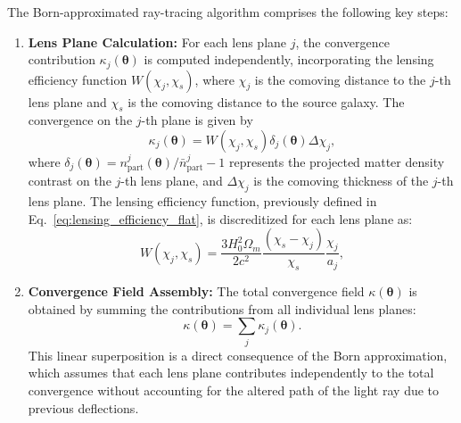 The Born-approximated ray-tracing algorithm comprises the following key steps:

\begin{enumerate}
    \item \textbf{Lens Plane Calculation:} 
    For each lens plane $j$, the convergence contribution $\kappa_j(\boldsymbol{\theta})$ is computed independently, incorporating the lensing efficiency function $W(\chi_j, \chi_s)$, where $\chi_j$ is the comoving distance to the $j$-th lens plane and $\chi_s$ is the comoving distance to the source galaxy. The convergence on the $j$-th plane is given by
    \begin{equation}
        \kappa_j(\boldsymbol{\theta}) = W(\chi_j, \chi_s) \delta_j(\boldsymbol{\theta}) \Delta \chi_j,
        \label{eq:kappa_born}
    \end{equation}
    where $\delta_j(\boldsymbol{\theta}) = n_{\mathrm{part}}^j(\boldsymbol{\theta}) / \bar{n}_{\mathrm{part}}^j - 1$ represents the projected matter density contrast on the $j$-th lens plane, and $\Delta \chi_j$ is the comoving thickness of the $j$-th lens plane. The lensing efficiency function, previously defined in Eq.~\eqref{eq:lensing_efficiency_flat}, is discreditized for each lens plane as:
    \begin{equation}
        W(\chi_j, \chi_s) = \frac{3 H_0^2 \Omega_m}{2 c^2} \frac{( \chi_s - \chi_j )}{ \chi_s } \frac{ \chi_j }{ a_j },
    \end{equation}

    \item \textbf{Convergence Field Assembly:} 
    The total convergence field $\kappa(\boldsymbol{\theta})$ is obtained by summing the contributions from all individual lens planes:
    \begin{equation}
        \kappa(\boldsymbol{\theta}) = \sum_{j} \kappa_j(\boldsymbol{\theta}).
        \label{eq:total_kappa}
    \end{equation}
    This linear superposition is a direct consequence of the Born approximation, which assumes that each lens plane contributes independently to the total convergence without accounting for the altered path of the light ray due to previous deflections.

\end{enumerate}
